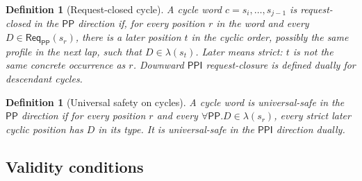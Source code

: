 \documentclass[11pt]{article}
\newtheorem{definition}[theorem]{Definition}
\newcommand{\PP}{\mathsf{PP}}
\newcommand{\PPI}{\mathsf{PPI}}
\newcommand{\Req}{\mathsf{Req}}
\begin{document}
\begin{definition}[Request-closed cycle]\label{def:request-closed-cycle}
A cycle word $c=s_i,\ldots,s_{j-1}$ is request-closed in the $\PP$ direction if, for every position $r$ in the word and every $D\in\Req_\PP(s_r)$, there is a later position $t$ in the cyclic order, possibly the same profile in the next lap, such that $D\in\lambda(s_t)$.  Later means strict: $t$ is not the same concrete occurrence as $r$.  Downward $\PPI$ request-closure is defined dually for descendant cycles.
\end{definition}

\begin{definition}[Universal safety on cycles]\label{def:cycle-safety}
A cycle word is universal-safe in the $\PP$ direction if for every position $r$ and every $\forall\PP.D\in\lambda(s_r)$, every strict later cyclic position has $D$ in its type.  It is universal-safe in the $\PPI$ direction dually.
\end{definition}

\subsection{Validity conditions}
\end{document}

